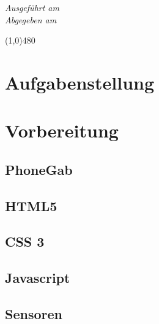 \documentclass[12pt, a4paper]{article}
\begin{document}
\begin{titlepage}
\begin{minipage}{0.57\textwidth}
\begin{center}
\LARGE
\textbf{\Titel}
\end{center}
\end{minipage}
\hspace{0.5cm}
\begin{minipage}{0.18\textwidth}
\begin{flushright} \large
\emph{Ausgef\"uhrt am} 
\Ausgefuehrt\\[0.4cm]
\emph{Abgegeben am} 
\Abgegeben
\end{flushright}
\end{minipage}
\begin{center}
\line(1,0){480}
\end{center}
\end{titlepage}

\tableofcontents

\newpage

\section{Aufgabenstellung}


\section{Vorbereitung}
\subsection{PhoneGab}


\subsection{HTML5}


\subsection{CSS 3}


\subsection{Javascript}


\subsection{Sensoren}

\end{document}
